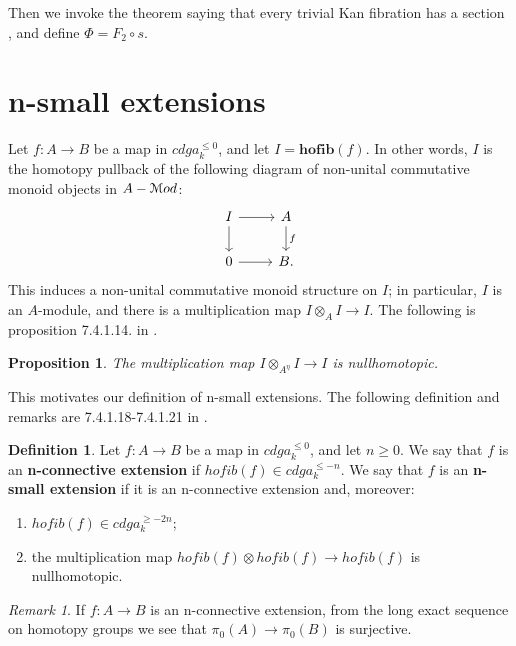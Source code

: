 \documentclass[10pt,a4paper,reqno,oneside]{book} %
\theoremstyle{plain}
\newtheorem{prop}[thm]{Proposition}
\theoremstyle{definition}
\newtheorem{defin}[thm]{Definition}
\theoremstyle{remark}
\newtheorem{rem}[thm]{Remark}
\numberwithin{equation}{section}
\begin{document}
Then we invoke the theorem saying that every trivial Kan fibration has a section , and define
$\Phi = F_2 \circ s$.




\section{n-small extensions}
\label{sect:sq0_nsmall}

Let $f: A \to B$ be a map in $cdga^{\leq 0}_k$, and let $I = \textbf{hofib}(f)$. In other words, $I$ is the homotopy pullback of
the following diagram of non-unital commutative monoid objects in $A-\mathcal M od$:
\[
\begin{tikzcd}
I\arrow{r}\arrow{d} & A\arrow{d}{f} \\
0 \arrow{r} & B.
\end{tikzcd}
\]
This induces a non-unital commutative monoid structure on $I$; in particular, $I$ is an $A$-module, and
there is a multiplication map $I \otimes_A I \to I$. The following is proposition 7.4.1.14. in \cite{Lurie_Higher_algebra}.

\begin{prop}
\label{prop:mult_nullhomotopic}
The multiplication map $I \otimes_{A^{\eta}} I \to I$ is nullhomotopic.
\end{prop}


This motivates our definition of n-small extensions.
The following definition and remarks are 7.4.1.18-7.4.1.21 in
\cite{Lurie_Higher_algebra}.

\begin{defin}
Let $f : A \to B$ be a map in $cdga_k^{\leq 0}$, and let $n\geq 0$. We say that $f$ is an \textbf{n-connective extension}
if $hofib(f) \in cdga_k^{\leq -n}$. We say that $f$ is an \textbf{n-small extension} if it is an n-connective extension and,
moreover:
\begin{enumerate}
\item \label{item:mult_nullhomotopic}
$hofib(f) \in cdga_k^{\geq -2n}$;
\item the multiplication map $hofib(f) \otimes hofib(f) \to hofib(f)$ is nullhomotopic.
\end{enumerate}
\end{defin}

\begin{rem}
If $f:A \to B$ is an n-connective extension, from the long exact sequence on homotopy groups we see that 
$\pi_0(A) \to \pi_0(B)$ is surjective.
\end{rem}
\end{document}
